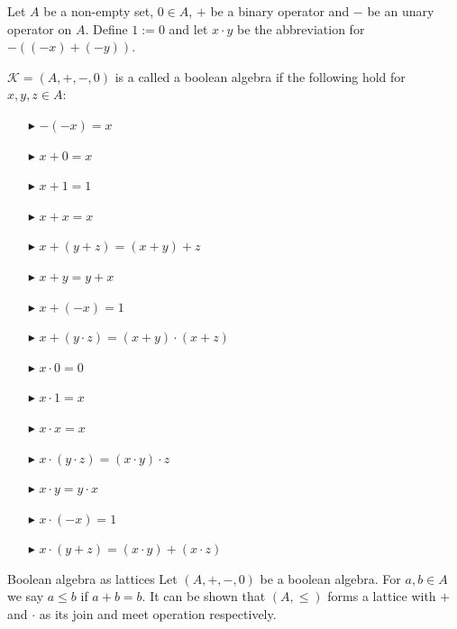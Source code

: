 \documentclass[10pt]{beamer}
\theoremstyle{definition}
\theoremstyle{definition}
\begin{document}
\begin{frame}\label{frame: boolean algebra}

\begin{definition}\label{defn: boolean algebra}
Let $A$ be a non-empty set, $0 \in A$, $+$ be a binary operator and $-$ be an unary operator
on $A$. Define $1 := 0$ and let $x\cdot y$ be the abbreviation for $-((-x)+(-y))$.\smallskip

$\mathcal{K} = (A,+,-,0)$ is a called a boolean algebra if the following hold
for $x, y, z \in A$:
\begin{multicols}{2}
\begin{enumerate}
\item[$\blacktriangleright$] $-(-x) = x$
\item[$\blacktriangleright$] $x + 0 = x$
\item[$\blacktriangleright$] $x + 1 = 1$
\item[$\blacktriangleright$] $x + x = x$
\item[$\blacktriangleright$] $x + (y + z) = (x + y) + z$
\item[$\blacktriangleright$] $x + y = y + x$
\item[$\blacktriangleright$] $x + (-x) = 1$
\item[$\blacktriangleright$] $x + (y\cdot z) = (x + y) \cdot (x + z)$
\item[]
\item[$\blacktriangleright$] $x \cdot 0 = 0$
\item[$\blacktriangleright$] $x \cdot 1 = x$
\item[$\blacktriangleright$] $x \cdot x = x$
\item[$\blacktriangleright$] $x \cdot (y \cdot z) = (x \cdot y) \cdot z$
\item[$\blacktriangleright$] $x \cdot y = y \cdot x$
\item[$\blacktriangleright$] $x \cdot (-x) = 1$
\item[$\blacktriangleright$] $x \cdot (y + z) = (x \cdot y) + (x \cdot z)$
\end{enumerate}
\end{multicols}
\end{definition}
\end{frame}

\begin{frame}\label{frame: boolean alg as lattice}
\begin{block}{Boolean algebra as lattices}
Let $(A,+,-,0)$ be a boolean algebra. For $a,b\in A$ we say $a\leq b$ if $a+b = b$.
It can be shown that $(A,\leq)$ forms a lattice with $+$ and $\cdot$ as its
join and meet operation respectively.
\end{block}
\end{frame}
\end{document}

